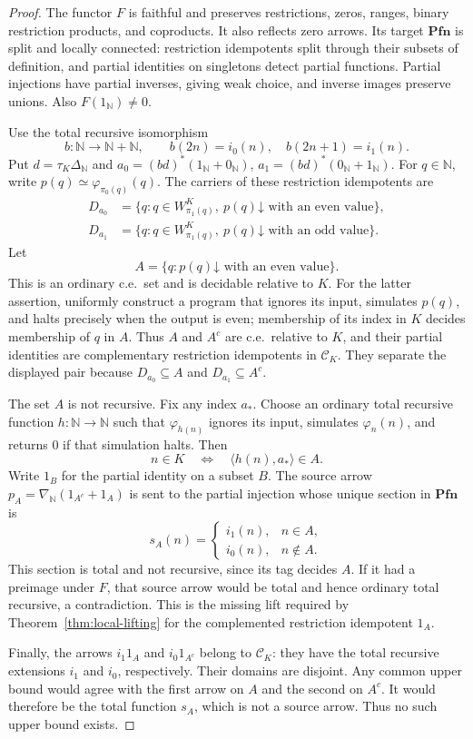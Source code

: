 \documentclass[11pt]{article}
\newcommand{\N}{\mathbb N}
\newcommand{\Pfn}{\mathbf{Pfn}}
\begin{document}
\begin{proof}
The functor $F$ is faithful and preserves restrictions, zeros,
ranges, binary restriction products, and coproducts. It also reflects
zero arrows. Its target $\Pfn$ is split and locally connected:
restriction idempotents split through their subsets of definition,
and partial identities on singletons detect partial functions.
Partial injections have partial inverses, giving weak choice, and
inverse images preserve unions. Also $F(1_{\N})\ne0$.

Use the total recursive isomorphism
\[
 b:\N\longrightarrow\N+\N,\qquad
 b(2n)=i_0(n),\quad b(2n+1)=i_1(n).
\]
Put $d=\tau_K\Delta_{\N}$ and
$a_0=(bd)^*(1_{\N}+0_{\N})$,
$a_1=(bd)^*(0_{\N}+1_{\N})$.
For $q\in\N$, write
$p(q)\simeq\varphi_{\pi_0(q)}(q)$. The carriers of these restriction idempotents are
\[
 \begin{aligned}
 D_{a_0}&=\{q:q\in W_{\pi_1(q)}^K,
                    \ p(q)\mathord\downarrow\text{ with an even value}\},\\
 D_{a_1}&=\{q:q\in W_{\pi_1(q)}^K,
                    \ p(q)\mathord\downarrow\text{ with an odd value}\}.
 \end{aligned}
\]
Let
\[
 A=\{q:p(q)\mathord\downarrow\text{ with an even value}\}.
\]
This is an ordinary c.e.\ set and is decidable relative to $K$.
For the latter assertion, uniformly construct a program that ignores
its input, simulates $p(q)$, and halts precisely when the output is
even; membership of its index in $K$ decides membership of $q$ in $A$.
Thus $A$ and $A^c$ are c.e.\ relative to $K$, and their partial
identities are complementary restriction idempotents in $\mathcal C_K$.
They separate the displayed pair because
$D_{a_0}\subseteq A$ and $D_{a_1}\subseteq A^c$.

The set $A$ is not recursive. Fix any index $a_*$. Choose an ordinary
total recursive function $h:\N\to\N$ such that $\varphi_{h(n)}$
ignores its input, simulates $\varphi_n(n)$, and returns $0$ if that
simulation halts. Then
\[
 n\in K\quad\Longleftrightarrow\quad
 \langle h(n),a_*\rangle\in A.
\]
Write $1_B$ for the partial identity on a subset $B$. The source
arrow $p_A=\nabla_{\N}(1_{A^c}+1_A)$ is sent to the partial
injection whose unique section in $\Pfn$ is
\[
 s_A(n)=
 \begin{cases}
  i_1(n),&n\in A,\\
  i_0(n),&n\notin A.
 \end{cases}
\]
This section is total and not recursive, since its tag decides $A$.
If it had a preimage under $F$, that source arrow would
be total and hence ordinary total recursive, a contradiction.
This is the missing lift required by
Theorem~\ref{thm:local-lifting} for the complemented restriction idempotent $1_A$.

Finally, the arrows $i_1 1_A$ and $i_0 1_{A^c}$ belong to
$\mathcal C_K$: they have the total recursive extensions $i_1$
and $i_0$, respectively. Their domains are disjoint. Any common
upper bound would agree with the first arrow on $A$ and the second
on $A^c$. It would therefore be the total function $s_A$, which
is not a source arrow. Thus no such upper bound exists.
\end{proof}
\end{document}
